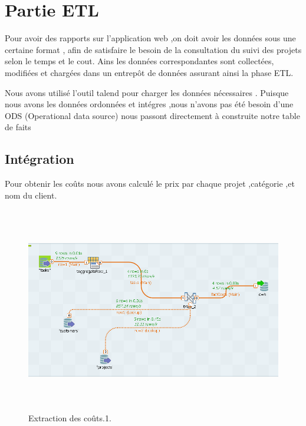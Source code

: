 \section{ Partie ETL }
Pour avoir des rapports sur l'application web ,on doit avoir les donn\'{e}es sous une certaine format ,
afin de satisfaire le besoin de la consultation du suivi des projets selon le temps et le cout.
Ains les donn\'{e}es correspondantes sont collect\'{e}es, modifi\'{e}es et charg\'{e}es dans un entrep\^{o}t de donn\'{e}es
assurant ainsi la phase ETL.

Nous avons utilis\'{e} l'outil talend pour charger les donn\'{e}es n\'{e}cessaires .
Puisque nous avons les donn\'{e}es ordonn\'{e}es et int\'{e}gres ,nous n'avons pas \'{e}t\'{e} besoin d'une ODS (Operational data source)
nous passont directement \`{a} construite notre table de faits



\subsection{Int\'{e}gration}


Pour obtenir les co\^{u}ts nous avons calcul\'{e} le prix par chaque projet 
,cat\'{e}gorie ,et nom du client.

\begin{figure}[H]
\center
\includegraphics[width=14cm,height=9cm]{./figures/integ.png}
\caption{Extraction des co\^{u}ts.1.}
\end{figure}




